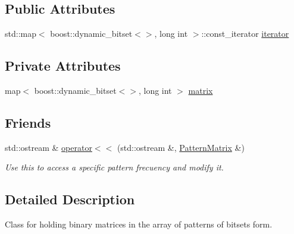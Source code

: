 \subsection*{Public Attributes}
\begin{DoxyCompactItemize}
\item 
std\+::map$<$ boost\+::dynamic\+\_\+bitset$<$$>$, long int $>$\+::const\+\_\+iterator \hyperlink{classPatternMatrix_a1f6b06290090ad0e891397e71b9a684e}{iterator}
\end{DoxyCompactItemize}
\subsection*{Private Attributes}
\begin{DoxyCompactItemize}
\item 
map$<$ boost\+::dynamic\+\_\+bitset$<$$>$, long int $>$ \hyperlink{classPatternMatrix_a76f1df5cd70ae108794659aaf5c79ffc}{matrix}
\end{DoxyCompactItemize}
\subsection*{Friends}
\begin{DoxyCompactItemize}
\item 
std\+::ostream \& \hyperlink{classPatternMatrix_a5afc4c77278cbd8308d593c9e4425a7d}{operator$<$$<$} (std\+::ostream \&, \hyperlink{classPatternMatrix}{Pattern\+Matrix} \&)
\begin{DoxyCompactList}\small\item\em Use this to access a specific pattern frecuency and modify it. \end{DoxyCompactList}\end{DoxyCompactItemize}


\subsection{Detailed Description}
Class for holding binary matrices in the array of patterns of bitsets form. 

